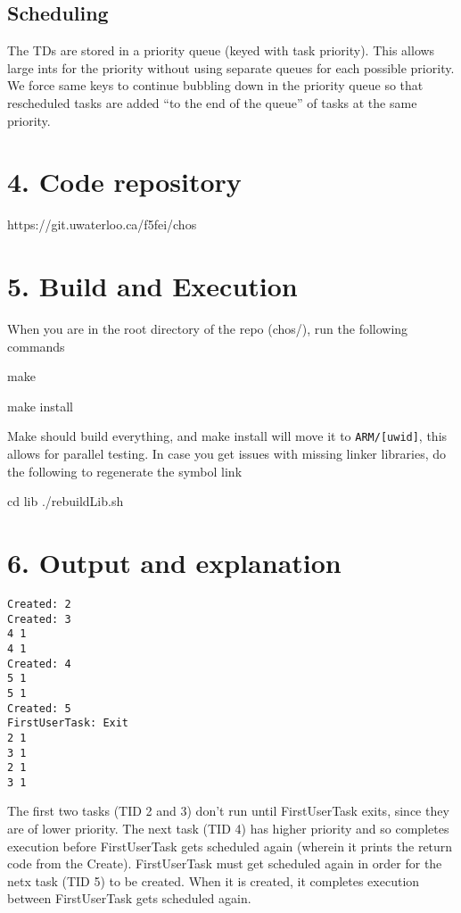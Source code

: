 \documentclass{article}
\begin{document}
\subsection*{Scheduling}

The TDs are stored in a priority queue (keyed with task priority). This allows large ints for the priority without using separate queues for each possible priority. We force same keys to continue bubbling down in the priority queue so that rescheduled tasks are added ``to the end of the queue'' of tasks at the same priority.

\section*{4. Code repository}

https://git.uwaterloo.ca/f5fei/chos

\section*{5. Build and Execution}

When you are in the root directory of the repo (chos/), run the following commands

make

make install

Make should build everything, and make install will move it to \texttt{ARM/[uwid]}, this allows for parallel testing.
In case you get issues with missing linker libraries, do the following to regenerate the symbol link

cd lib
./rebuildLib.sh

\section*{6. Output and explanation}

\begin{verbatim}
Created: 2
Created: 3
4 1
4 1
Created: 4
5 1
5 1
Created: 5
FirstUserTask: Exit
2 1
3 1
2 1
3 1
\end{verbatim}

The first two tasks (TID 2 and 3) don't run until FirstUserTask exits, since they are of lower priority. The next task (TID 4) has higher priority and so completes execution before FirstUserTask gets scheduled again (wherein it prints the return code from the Create). FirstUserTask must get scheduled again in order for the netx task (TID 5) to be created. When it is created, it completes execution between FirstUserTask gets scheduled again.
\end{document}

